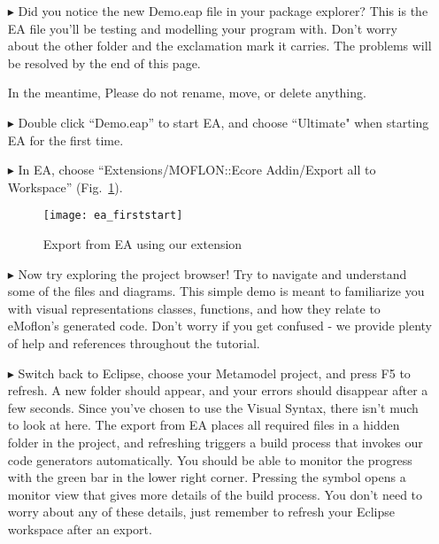 \newpage
\visHeader

\begin{itemize}
\FloatBarrier
\item[$\blacktriangleright$] Did you notice the new Demo.eap file in your package explorer? This is the EA file you'll be testing and modelling your program with. Don't worry about the other folder and the exclamation mark it carries. The problems will be resolved by the end of this page.

In the meantime, Please do not rename, move, or delete anything.

\item[$\blacktriangleright$] Double click ``Demo.eap'' to start EA, and choose ``Ultimate" when starting EA for the first time.

\item[$\blacktriangleright$] In EA, choose ``Extensions/MOFLON::Ecore Addin/Export\- all\- to\- Workspace'' (Fig.~\ref{fig_ea}).

\vspace{1cm}

\begin{figure}[htbp]
	\centering
  \texttt{[image: ea\_firststart]}
	\caption{Export from EA using our extension} 
	\label{fig_ea} 
\end{figure}

\vspace{1cm}

\item[$\blacktriangleright$] Now try exploring the project browser! Try to navigate and understand some of the files and diagrams. This simple demo is meant to familiarize you with visual representations classes, functions, and how they relate to eMoflon's generated code. Don't worry if you get confused - we provide plenty of help and references throughout the tutorial.
  
\item[$\blacktriangleright$] Switch back to Eclipse, choose your Metamodel project, and press F5 to refresh. A new folder should appear, and your errors should disappear after a few seconds. Since you've chosen to use the Visual Syntax, there isn't much to look at here. The export from EA places all required files in a hidden folder in the project, and refreshing triggers a build process that invokes our code generators automatically. 
You should be able to monitor the progress with the green bar in the lower right corner. Pressing the symbol opens a monitor view that gives more details of the build process. You don't need to worry about any of these details, just remember to refresh your Eclipse workspace after an export.

\end{itemize}